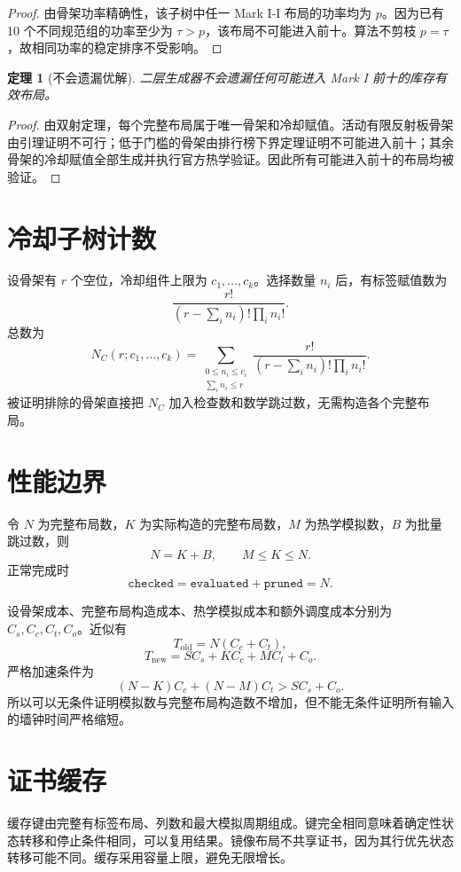 \documentclass[UTF8,11pt]{ctexart}
\newtheorem{theorem}[definition]{定理}
\begin{document}
\begin{proof}
由骨架功率精确性，该子树中任一 Mark I-I 布局的功率均为 $p$。因为已有 10 个不同规范组的功率至少为 $\tau>p$，该布局不可能进入前十。算法不剪枝 $p=\tau$，故相同功率的稳定排序不受影响。
\end{proof}

\begin{theorem}[不会遗漏优解]
二层生成器不会遗漏任何可能进入 Mark I 前十的库存有效布局。
\end{theorem}

\begin{proof}
由双射定理，每个完整布局属于唯一骨架和冷却赋值。活动有限反射板骨架由引理证明不可行；低于门槛的骨架由排行榜下界定理证明不可能进入前十；其余骨架的冷却赋值全部生成并执行官方热学验证。因此所有可能进入前十的布局均被验证。
\end{proof}

\section{冷却子树计数}

设骨架有 $r$ 个空位，冷却组件上限为 $c_1,\ldots,c_k$。选择数量 $n_i$ 后，有标签赋值数为
\[
\frac{r!}{(r-\sum_i n_i)!\prod_i n_i!}.
\]
总数为
\[
N_C(r;c_1,\ldots,c_k)=
\sum_{\substack{0\le n_i\le c_i\\\sum_i n_i\le r}}
\frac{r!}{(r-\sum_i n_i)!\prod_i n_i!}.
\]
被证明排除的骨架直接把 $N_C$ 加入检查数和数学跳过数，无需构造各个完整布局。

\section{性能边界}

令 $N$ 为完整布局数，$K$ 为实际构造的完整布局数，$M$ 为热学模拟数，$B$ 为批量跳过数，则
\[
N=K+B,\qquad M\le K\le N.
\]
正常完成时
\[
\texttt{checked}=\texttt{evaluated}+\texttt{pruned}=N.
\]

设骨架成本、完整布局构造成本、热学模拟成本和额外调度成本分别为 $C_s,C_c,C_t,C_o$。近似有
\[
T_{\mathrm{old}}=N(C_c+C_t),
\]
\[
T_{\mathrm{new}}=SC_s+KC_c+MC_t+C_o.
\]
严格加速条件为
\[
(N-K)C_c+(N-M)C_t>SC_s+C_o.
\]
所以可以无条件证明模拟数与完整布局构造数不增加，但不能无条件证明所有输入的墙钟时间严格缩短。

\section{证书缓存}

缓存键由完整有标签布局、列数和最大模拟周期组成。键完全相同意味着确定性状态转移和停止条件相同，可以复用结果。镜像布局不共享证书，因为其行优先状态转移可能不同。缓存采用容量上限，避免无限增长。
\end{document}
